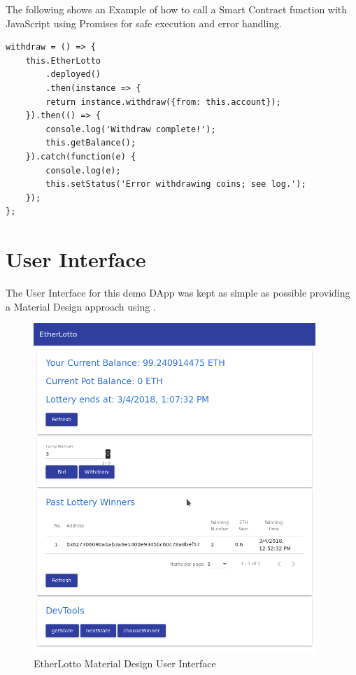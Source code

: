 The following shows an Example of how to call a Smart Contract function with JavaScript using Promises for safe execution and error handling.
\begin{lstlisting}
withdraw = () => {
    this.EtherLotto
        .deployed()
        .then(instance => {
        return instance.withdraw({from: this.account});
    }).then(() => {
        console.log('Withdraw complete!');
        this.getBalance();
    }).catch(function(e) {
        console.log(e);
        this.setStatus('Error withdrawing coins; see log.');
    });
};
\end{lstlisting}

\newpage
\section{User Interface}\label{sec:ui}

The User Interface for this demo \ac{DApp} was kept as simple as possible providing a Material Design approach using .

\begin{figure}[h]
  \centering
  \includegraphics[keepaspectratio,width=0.95\textwidth]{images/ui}
  \caption[EtherLotto UI]{EtherLotto Material Design User Interface}
  \label{fig:ui}
\end{figure}

